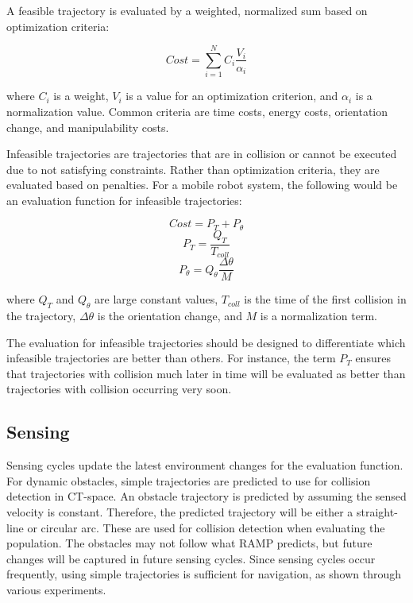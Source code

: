 \documentclass[10pt,conference]{ieeeconf}
\begin{document}
A feasible trajectory is evaluated by a weighted, normalized sum based on optimization criteria:

\begin{equation}
	Cost = \sum_{i=1}^{N} C_i\frac{V_i}{\alpha_i}
\end{equation}

where $C_i$ is a weight, $V_i$ is a value for an optimization criterion, and $\alpha_i$ is a normalization value. Common criteria are time costs, energy costs, orientation change, and manipulability costs.

Infeasible trajectories are trajectories that are in collision or cannot be executed due to not satisfying constraints. Rather than optimization criteria, they are evaluated based on penalties. For a mobile robot system, the following would be an evaluation function for infeasible trajectories:

\begin{equation}
Cost = P_T + P_\theta
\end{equation}
\begin{equation}
P_T = \frac{Q_T}{T_{coll}}
\end{equation}
\begin{equation}
P_\theta = Q_\theta\frac{\Delta\theta}{M}
\end{equation}

where $Q_T$ and $Q_θ$ are large constant values, $T_{coll}$ is the time
of the first collision in the trajectory, $\Delta\theta$ is the orientation change, and $M$ is a normalization term.

The evaluation for infeasible trajectories should be designed to differentiate which infeasible trajectories are better than others. For instance, the term $P_T$ ensures that trajectories with collision much later in time will be evaluated as better than trajectories with collision occurring very soon.

\subsection{Sensing}

Sensing cycles update the latest environment changes for the evaluation function. For dynamic obstacles, simple trajectories are predicted to use for collision detection in CT-space. An obstacle trajectory is predicted by assuming the sensed velocity is constant. Therefore, the predicted trajectory will be either a straight-line or circular arc. These are used for collision detection when evaluating the population. The obstacles may not follow what RAMP predicts, but future changes will be captured in future sensing cycles. Since sensing cycles occur frequently, using simple trajectories is sufficient for navigation, as shown through various experiments.
\end{document}
